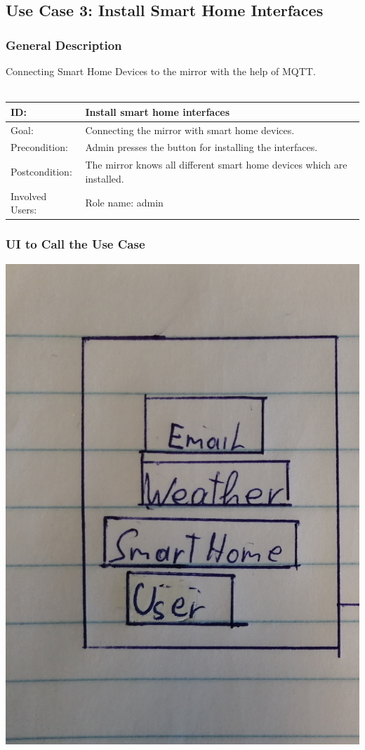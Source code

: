 \documentclass[12pt]{article}
\theoremstyle{definition}
\begin{document}
\subsection{Use Case 3: Install Smart Home Interfaces}
\subsubsection{General Description}
Connecting Smart Home Devices to the mirror with the help of MQTT. \\
\\
\begin{tabular}{|p{.2\linewidth}|p{.65\linewidth}|}
\hline 
ID: & Install smart home interfaces\\ \hline
Goal: & Connecting the mirror with smart home devices.\\ \hline
Precondition: & Admin presses the button for installing the interfaces.\\ \hline
Postcondition: & The mirror knows all different smart home devices which are installed. \\ \hline
Involved Users: & Role name: admin  \\ \hline
\end{tabular}

\subsubsection{UI to Call the Use Case}
\begin{center}
\includegraphics[scale=.1]{UseCase/StandardView.jpg}\\
\end{center}
\end{document}
